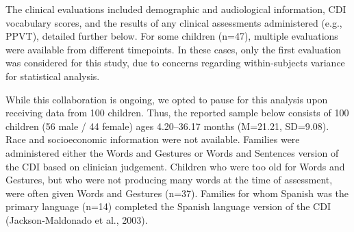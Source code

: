 \documentclass[
  english,
  man]{apa6}
\begin{document}
The clinical evaluations included demographic and audiological information, CDI vocabulary scores, and the results of any clinical assessments administered (e.g., PPVT), detailed further below. For some children (n=47), multiple evaluations were available from different timepoints. In these cases, only the first evaluation was considered for this study, due to concerns regarding within-subjects variance for statistical analysis.

While this collaboration is ongoing, we opted to pause for this analysis upon receiving data from 100 children. Thus, the reported sample below consists of 100 children (56 male / 44 female) ages 4.20--36.17 months (M=21.21, SD=9.08). Race and socioeconomic information were not available. Families were administered either the Words and Gestures or Words and Sentences version of the CDI based on clinician judgement. Children who were too old for Words and Gestures, but who were not producing many words at the time of assessment, were often given Words and Gestures (n=37). Families for whom Spanish was the primary language (n=14) completed the Spanish language version of the CDI (Jackson-Maldonado et al., 2003).

\begin{table}

\caption{\label{tab:CDIinfo}CDI details}
\centering
{}
\end{table}
\end{document}
